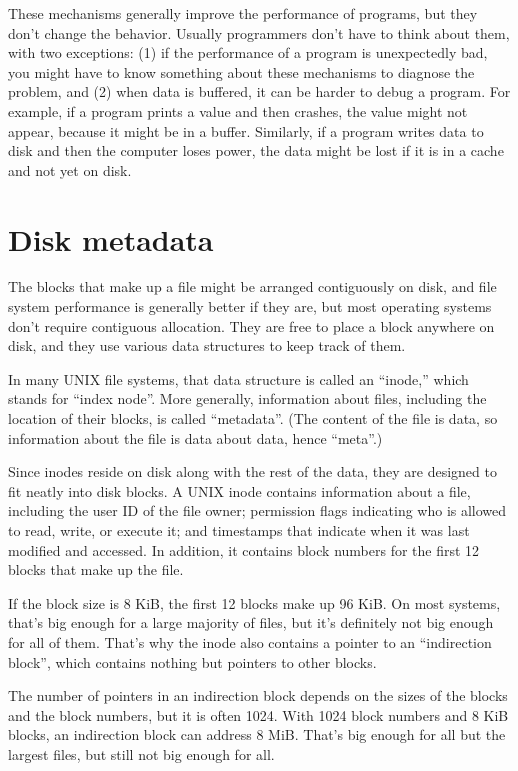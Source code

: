 \documentclass[12pt]{book}
\begin{document}
These mechanisms generally improve the performance of
programs, but they don't change the behavior.  Usually programmers
don't have to think about them, with two exceptions: (1) if the
performance of a program is unexpectedly bad, you might have to know
something about these mechanisms to diagnose the problem, and (2)
when data is buffered, it can be harder to debug a program.  For
example, if a program prints a value and then crashes, the value
might not appear, because it might be in a buffer.  Similarly, if a
program writes data to disk and then the computer loses power, the
data might be lost if it is in a cache and not yet on disk.


\section{Disk metadata}

The blocks that make up a file might be arranged contiguously on
disk, and file system performance is generally better if they are,
but most operating systems don't require contiguous allocation.
They are free to place a block anywhere on disk, and they use
various data structures to keep track of them.

In many UNIX file systems, that data structure is called an ``inode,''
which stands for ``index node''.  More generally, information about
files, including the location of their blocks, is called ``metadata''.
(The content of the file is data, so information about the file is
data about data, hence ``meta''.)

Since inodes reside on disk along with the rest of the data, they are
designed to fit neatly into disk blocks.  A UNIX inode contains
information about a file, including the user ID of the file owner;
permission flags indicating who is allowed to read, write, or execute
it; and timestamps that indicate when it was last modified and
accessed.  In addition, it contains block numbers for the first 12
blocks that make up the file.

If the block size is 8 KiB, the first 12 blocks make up 96 KiB.
On most systems, that's big enough for a large majority of files,
but it's definitely not big enough for all of them.  That's
why the inode also contains a pointer to an ``indirection block'',
which contains nothing but pointers to other blocks.

The number of pointers in an indirection block depends on the sizes of
the blocks and the block numbers, but it is often 1024.  With 1024
block numbers and 8 KiB blocks, an indirection block can address 8
MiB.  That's big enough for all but the largest files, but still not
big enough for all.
\end{document}

